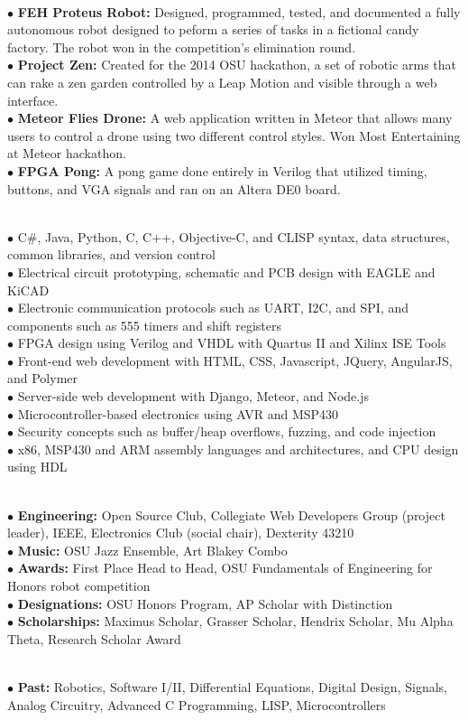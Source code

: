 \documentclass[10pt]{article}
\begin{document}
\\
$\bullet$ {\bf FEH Proteus Robot:} Designed, programmed, tested, and documented a fully autonomous robot designed to peform a series of tasks in a fictional candy factory. The robot won in the competition's elimination round.\\
$\bullet$ {\bf Project Zen:} Created for the 2014 OSU hackathon, a set of robotic arms that can rake a zen garden controlled by a Leap Motion and visible through a web interface.\\
$\bullet$ {\bf Meteor Flies Drone:} A web application written in Meteor that allows many users to control a drone using two different control styles. Won Most Entertaining at Meteor hackathon.\\
$\bullet$ {\bf FPGA Pong:} A pong game done entirely in Verilog that utilized timing, buttons, and VGA signals and ran on an Altera DE0 board.
\medskip

\\
$\bullet$ C\#, Java, Python, C, C++, Objective-C, and CLISP syntax, data structures, common libraries, and version control\\
$\bullet$ Electrical circuit prototyping, schematic and PCB design with EAGLE and KiCAD\\
$\bullet$ Electronic communication protocols such as UART, I2C, and SPI, and components such as 555 timers and shift registers\\
$\bullet$ FPGA design using Verilog and VHDL with Quartus II and Xilinx ISE Tools\\
$\bullet$ Front-end web development with HTML, CSS, Javascript, JQuery, AngularJS, and Polymer\\
$\bullet$ Server-side web development with Django, Meteor, and Node.js\\
$\bullet$ Microcontroller-based electronics using AVR and MSP430\\
$\bullet$ Security concepts such as buffer/heap overflows, fuzzing, and code injection\\
$\bullet$ x86, MSP430 and ARM assembly languages and architectures, and CPU design using HDL
\medskip

\\
$\bullet$ {\bf Engineering:} Open Source Club, Collegiate Web Developers Group (project leader), IEEE, Electronics Club (social chair), Dexterity 43210\\
$\bullet$ {\bf Music:} OSU Jazz Ensemble, Art Blakey Combo\\
$\bullet$ {\bf Awards:} First Place Head to Head, OSU Fundamentals of Engineering for Honors robot competition\\
$\bullet$ {\bf Designations:} OSU Honors Program, AP Scholar with Distinction\\
$\bullet$ {\bf Scholarships:} Maximus Scholar, Grasser Scholar, Hendrix Scholar, Mu Alpha Theta, Research Scholar Award
\medskip

\\
$\bullet$ {\bf Past:} Robotics, Software I/II, Differential Equations, Digital Design, Signals, Analog Circuitry, Advanced C Programming, LISP, Microcontrollers\\
\end{document}
